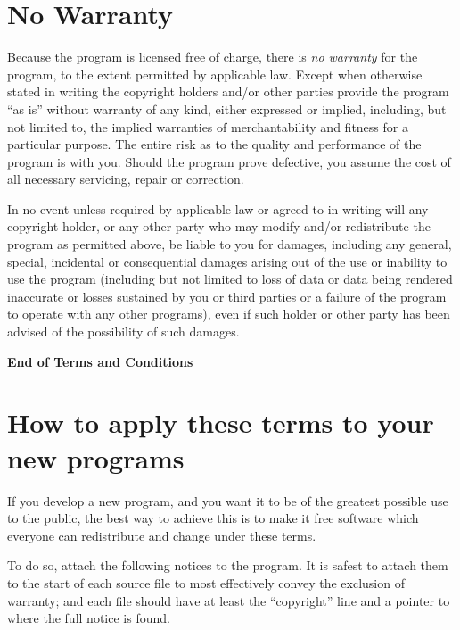 \documentclass[%
	11pt,
        a4paper,
        twoside]{workrep}
\begin{document}
\section{No Warranty}

\gnuitem %
\begin{bfseries}
 Because the program is licensed free of charge, there is \emph{no warranty}
for the program, to the extent permitted by applicable law.  Except when
otherwise stated in writing the copyright holders and/or other parties
provide the program ``as is'' without warranty of any kind, either expressed
or implied, including, but not limited to, the implied warranties of
merchantability and fitness for a particular purpose.  The entire risk as
to the quality and performance of the program is with you.  Should the
program prove defective, you assume the cost of all necessary servicing,
repair or correction.
\end{bfseries}

\gnuitem %
\begin{bfseries}
In no event unless required by applicable law or agreed to in writing
will any copyright holder, or any other party who may modify and/or
redistribute the program as permitted above, be liable to you for damages,
including any general, special, incidental or consequential damages arising
out of the use or inability to use the program (including but not limited
to loss of data or data being rendered inaccurate or losses sustained by
you or third parties or a failure of the program to operate with any other
programs), even if such holder or other party has been advised of the
possibility of such damages.
\end{bfseries}

\begin{center}\bfseries\large
End of Terms and Conditions
\end{center}

\section{How to apply these terms to your new programs}

If you develop a new program, and you want it to be of the greatest
possible use to the public, the best way to achieve this is to make it
free software which everyone can redistribute and change under these terms.

To do so, attach the following notices to the program.  It is safest
to attach them to the start of each source file to most effectively
convey the exclusion of warranty; and each file should have at least
the ``copyright'' line and a pointer to where the full notice is found.
\end{document}
